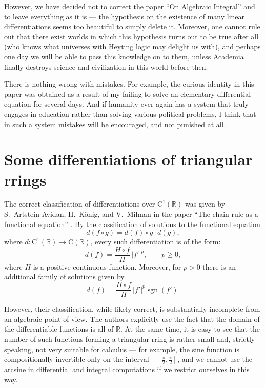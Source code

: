 \documentclass[12pt]{article}
\theoremstyle{definition}
\begin{document}
\vspace{5pt}
However, we have decided not to correct the paper ``On Algebraic Integral'' and to leave everything as it is 
--- the hypothesis on the existence of many linear differentiations seems too beautiful to simply delete it. 
Moreover, one cannot rule out that there exist worlds in which this hypothesis turns out to be true after all 
(who knows what universes with Heyting logic may delight us with), and perhaps one day we will be able to pass this 
knowledge on to them, unless Academia finally destroys science and civilization in this world before then.

\vspace{5pt}
There is nothing wrong with mistakes. For example, the curious identity in this paper was obtained as a result of 
my failing to solve an elementary differential equation for several days. And if humanity ever again has a system that 
truly engages in education rather than solving various political problems, I think that in such a system mistakes will 
be encouraged, and not punished at all.

\newpage
\section{Some differentiations of triangular rrings}

The correct classification of differentiations over \(\mathrm{C}^1(\mathbb{R})\) was given by S.~Artstein-Avidan, H.~K\"onig, 
and V.~Milman in the paper ``The chain rule as a functional equation'' \cite{Artstein-Avidan2010}.
By the classification of solutions to the functional equation
\[
d(f\circ g)=d(f)\circ g \cdot d(g),
\]
where \(d:\mathrm{C}^1(\mathbb{R})\to \mathrm{C}(\mathbb{R})\), every such differentiation is of the form:
\[
d(f)=\frac{H\circ f}{H}\,|f'|^p,
\qquad p\ge0,
\]
where \(H\) is a positive continuous function. Moreover, for \(p>0\) there is an additional family of solutions given by
\[
d(f)=\frac{H\circ f}{H}\,|f'|^p\operatorname{sgn}(f').
\]

\vspace{10pt}
However, their classification, while likely correct, is substantially incomplete from an algebraic point of view. 
The authors explicitly use the fact that the domain of the differentiable functions is all of \(\mathbb{R}\). 
At the same time, it is easy to see that the number of such functions forming a triangular rring is rather small and, 
strictly speaking, not very suitable for calculus --- for example, the sine function is compositionally invertible 
only on the interval \([-\frac{\pi}{2}, \frac{\pi}{2}]\), and we cannot use the arcsine in differential and integral 
computations if we restrict ourselves in this way.
\end{document}
